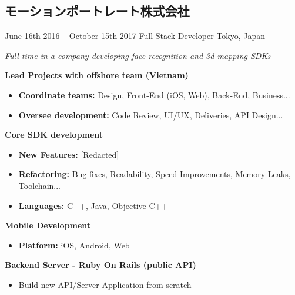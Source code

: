 \documentclass[]{template/friggeri-cv} %
\begin{document}
\subsection{モーションポートレート株式会社}
\begin{entrylist}


\entry
{June 16th 2016 -- October 15th 2017}
{Full Stack Developer}
{Tokyo, Japan}
{\emph{Full time in a company developing face-recognition and 3d-mapping SDKs}

\textbf{Lead Projects with offshore team (Vietnam)} 
\begin{itemize}
\item \textbf{Coordinate teams:} Design, Front-End (iOS, Web), Back-End, Business...
\item \textbf{Oversee development:} Code Review, UI/UX, Deliveries, API Design...
\end{itemize}
\textbf{Core SDK development} 
\begin{itemize}
\item \textbf{New Features:} [Redacted]
\item \textbf{Refactoring:} Bug fixes, Readability, Speed Improvements, Memory Leaks, Toolchain...
\item \textbf{Languages:} C++, Java, Objective-C++

\end{itemize}
\textbf{Mobile Development} 
\begin{itemize}
\item \textbf{Platform:} iOS, Android, Web
\end{itemize}

\textbf{Backend Server - Ruby On Rails (public API)} 
\begin{itemize}
\item Build new API/Server Application from scratch
\end{itemize}
}
\end{entrylist}



\end{document}
